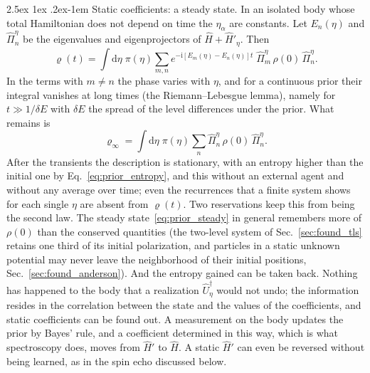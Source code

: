 \documentclass[10pt,a4paper]{article}
\makeatletter
\renewcommand{\paragraph}{\@startsection{paragraph}{4}{\z@}%
  {2.5ex \@plus 1ex \@minus .2ex}{-1em}%
  {\normalfont\fontsize{14pt}{17pt}\selectfont\bfseries}}
\newcommand{\dd}{\mathrm{d}}
\newcommand{\ii}{\mathrm{i}}
\makeatother
\begin{document}
\paragraph{Static coefficients: a steady state.}
In an isolated body whose total Hamiltonian does not depend on time the $ \eta_\alpha $ are constants.
Let $ E_n(\eta) $ and $ \hat\Pi_n^{\eta} $ be the eigenvalues and eigenprojectors of $ \hat H + \hat H'_\eta $.
Then
\[
  \varrho(t) = \int\!\dd\eta\;\pi(\eta)\sum_{m,n}
  e^{-\ii [E_m(\eta) - E_n(\eta)]t}\;\hat\Pi_m^{\eta}\,\rho(0)\,\hat\Pi_n^{\eta} .
\]
In the terms with $ m \neq n $ the phase varies with $ \eta $, and for a continuous prior their integral vanishes at long times (the Riemann--Lebesgue lemma), namely for $ t \gg 1/\delta E $ with $ \delta E $ the spread of the level differences under the prior.
What remains is
\begin{equation}\label{eq:prior_steady}
  \varrho_\infty = \int\!\dd\eta\;\pi(\eta)\sum_n\hat\Pi_n^{\eta}\,\rho(0)\,\hat\Pi_n^{\eta} .
\end{equation}
After the transients the description is stationary, with an entropy higher than the initial one by Eq.~\eqref{eq:prior_entropy}, and this without an external agent and without any average over time; even the recurrences that a finite system shows for each single $ \eta $ are absent from $ \varrho(t) $.
Two reservations keep this from being the second law.
The steady state~\eqref{eq:prior_steady} in general remembers more of $ \rho(0) $ than the conserved quantities (the two-level system of Sec.~\ref{sec:found_tls} retains one third of its initial polarization, and particles in a static unknown potential may never leave the neighborhood of their initial positions, Sec.~\ref{sec:found_anderson}).
And the entropy gained can be taken back.
Nothing has happened to the body that a realization $ \hat U_\eta^\dagger $ would not undo; the information resides in the correlation between the state and the values of the coefficients, and static coefficients can be found out.
A measurement on the body updates the prior by Bayes' rule, and a coefficient determined in this way, which is what spectroscopy does, moves from $ \hat H' $ to $ \hat H $.
A static $ \hat H' $ can even be reversed without being learned, as in the spin echo discussed below.
\end{document}

